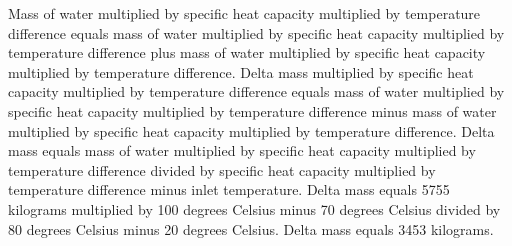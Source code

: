 Mass of water multiplied by specific heat capacity multiplied by temperature difference equals mass of water multiplied by specific heat capacity multiplied by temperature difference plus mass of water multiplied by specific heat capacity multiplied by temperature difference.  
Delta mass multiplied by specific heat capacity multiplied by temperature difference equals mass of water multiplied by specific heat capacity multiplied by temperature difference minus mass of water multiplied by specific heat capacity multiplied by temperature difference.  
Delta mass equals mass of water multiplied by specific heat capacity multiplied by temperature difference divided by specific heat capacity multiplied by temperature difference minus inlet temperature.  
Delta mass equals 5755 kilograms multiplied by 100 degrees Celsius minus 70 degrees Celsius divided by 80 degrees Celsius minus 20 degrees Celsius.  
Delta mass equals 3453 kilograms.
